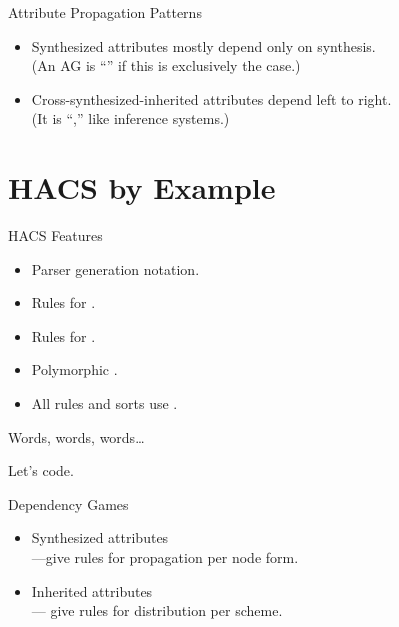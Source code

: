 \documentclass[pdftex,aspectratio=169,14pt]{beamer}
\begin{document}
\begin{frame}{Attribute Propagation Patterns}
  \begin{itemize}

  \item Synthesized attributes \alert{mostly} depend only on synthesis.\\
    (An AG is ``'' if this is exclusively the case.)

  \item Cross-synthesized-inherited attributes depend \alert{left to right}.\\
    (It is ``,'' like inference systems.)

  \end{itemize}
\end{frame}


\section{HACS by Example}
\frame{\tableofcontents[current]}

\begin{frame}{HACS Features}
  \begin{itemize}
  \item Parser generation notation.\\
  \item Rules for .
  \item Rules for .
  \item Polymorphic .
  \item All rules and sorts use .
  \end{itemize}
\end{frame}

\begin{frame}{Words, words, words…}
  \begin{center}
    \alert{Let's code.}
  \end{center}
\end{frame}

\begin{frame}{Dependency Games}
  \begin{itemize}
  \item Synthesized attributes \\\pause%
    ---give rules for \alert{propagation per node form}.\pause
  \item Inherited attributes \\\pause%
    --- give rules for \alert{distribution per scheme}.
  \end{itemize}
\end{frame}
\end{document}
